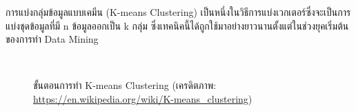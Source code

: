 การแบ่งกลุ่มข้อมูลแบบเคมีน (K-means Clustering) เป็นหนึ่งในวิธีการแบ่งเวกเตอร์ซึ่งจะเป็นการแบ่งชุดข้อมูลที่มี n ข้อมูลออกเป็น k กลุ่ม
ซึ่งเทคนิคนี้ได้ถูกใช้มาอย่างยาวนานตั้งแต่ในช่วงยุคเริ่มต้นของการทำ Data Mining\autocite{macqueen1967}

\begin{figure}[H]
    \centering
    \hspace{1em}
    \\
    \vspace{1em}
    \hspace{1em}
    \caption{ขั้นตอนการทำ K-means Clustering (เครดิตภาพ: \url{https://en.wikipedia.org/wiki/K-means_clustering})}
    \label{fig:k_means}
\end{figure}
 
